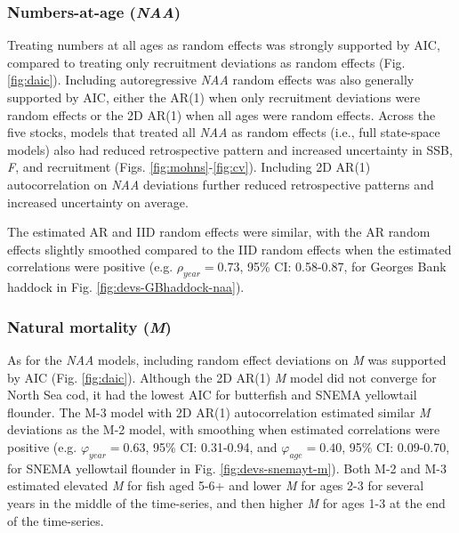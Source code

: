 \documentclass[]{article}
\begin{document}
\hypertarget{numbers-at-age-naa-1}{%
\subsubsection{\texorpdfstring{Numbers-at-age
(\emph{NAA})}{Numbers-at-age (NAA)}}\label{numbers-at-age-naa-1}}

Treating numbers at all ages as random effects was strongly supported by
AIC, compared to treating only recruitment deviations as random effects
(Fig. \ref{fig:daic}). Including autoregressive \emph{NAA} random
effects was also generally supported by AIC, either the AR(1) when only
recruitment deviations were random effects or the 2D AR(1) when all ages
were random effects. Across the five stocks, models that treated all
\emph{NAA} as random effects (i.e., full state-space models) also had
reduced retrospective pattern and increased uncertainty in SSB,
\emph{F}, and recruitment (Figs. \ref{fig:mohns}-\ref{fig:cv}).
Including 2D AR(1) autocorrelation on \emph{NAA} deviations further
reduced retrospective patterns and increased uncertainty on average.

The estimated AR and IID random effects were similar, with the AR random
effects slightly smoothed compared to the IID random effects when the
estimated correlations were positive (e.g. \(\rho_{year} = 0.73\), 95\%
CI: 0.58-0.87, for Georges Bank haddock in Fig.
\ref{fig:devs-GBhaddock-naa}).

\hypertarget{natural-mortality-m-1}{%
\subsubsection{\texorpdfstring{Natural mortality
(\emph{M})}{Natural mortality (M)}}\label{natural-mortality-m-1}}

As for the \emph{NAA} models, including random effect deviations on
\emph{M} was supported by AIC (Fig. \ref{fig:daic}). Although the 2D
AR(1) \emph{M} model did not converge for North Sea cod, it had the
lowest AIC for butterfish and SNEMA yellowtail flounder. The M-3 model
with 2D AR(1) autocorrelation estimated similar \emph{M} deviations as
the M-2 model, with smoothing when estimated correlations were positive
(e.g. \(\varphi_{year} = 0.63\), 95\% CI: 0.31-0.94, and
\(\varphi_{age} = 0.40\), 95\% CI: 0.09-0.70, for SNEMA yellowtail
flounder in Fig. \ref{fig:devs-snemayt-m}). Both M-2 and M-3 estimated
elevated \emph{M} for fish aged 5-6+ and lower \emph{M} for ages 2-3 for
several years in the middle of the time-series, and then higher \emph{M}
for ages 1-3 at the end of the time-series.
\end{document}
